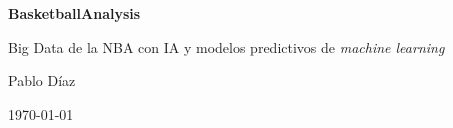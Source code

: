 \documentclass[12pt,a4paper]{report}
\newcommand{\titulo}{BasketballAnalysis}
\newcommand{\subtitulo}{Big Data de la NBA con IA y modelos predictivos de \textit{machine learning}}
\newcommand{\autor}{Pablo Díaz}
\newcommand{\fecha}{\today}
\begin{document}
\begin{titlepage}
  \centering
  {\huge \bfseries \titulo \par}
  \vspace{0.6cm}
  {\large \subtitulo \par}
  \vfill
  {\Large \autor \par}
  \vspace{0.4cm}
  {\large \fecha \par}
\end{titlepage}

\tableofcontents
\cleardoublepage
\listoffigures
\cleardoublepage








\end{document}
